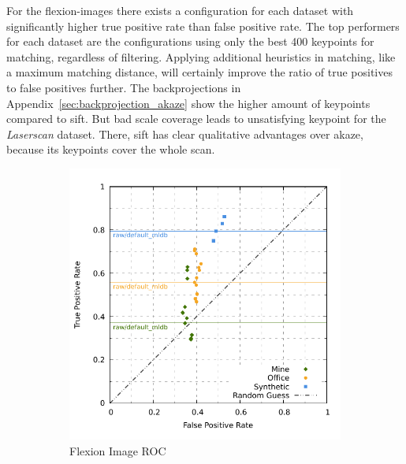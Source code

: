 For the \glspl{flexion-image} there exists a configuration for each dataset with significantly higher true positive rate than false positive rate.
The top performers for each dataset are the configurations using only the best 400 keypoints for matching, regardless of filtering.
Applying additional heuristics in matching, like a maximum matching distance, will certainly improve the ratio of true positives to false positives further.
The backprojections in Appendix~\ref{sec:backprojection_akaze} show the higher amount of keypoints compared to \acrshort{sift}.
But bad scale coverage leads to unsatisfying keypoint for the \emph{Laserscan} dataset.
There, \acrshort{sift} has clear qualitative advantages over \acrshort{akaze}, because its keypoints cover the whole scan.
\begin{figure}[H]
\begin{subfigure}[t]{0.45\linewidth}
    \includegraphics[width=\linewidth]{chapter06/results/AKAZE/flexion/roc.pdf}%
    \caption{Flexion Image ROC}
\end{subfigure}\quad
\begin{subfigure}[t]{0.45\linewidth}

\end{subfigure}
\end{figure}
